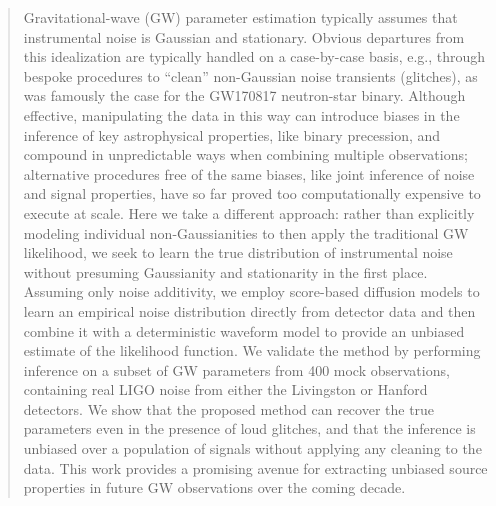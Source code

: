 \documentclass[twocolumn]{aastex631}
\begin{document}
\begin{abstract}
Gravitational-wave (GW) parameter estimation typically assumes that instrumental noise is Gaussian and stationary. Obvious departures from this idealization are typically handled on a case-by-case basis, e.g., through bespoke procedures to ``clean'' non-Gaussian noise transients (glitches), as was famously the case for the GW170817 neutron-star binary. Although effective, manipulating the data in this way can introduce biases in the inference of key astrophysical properties, like binary precession, and compound in unpredictable ways when combining multiple observations; alternative procedures free of the same biases, like joint inference of noise and signal properties, have so far proved too computationally expensive to execute at scale. Here we take a different approach: rather than explicitly modeling individual non-Gaussianities to then apply the traditional GW likelihood, we seek to learn the true distribution of instrumental noise without presuming Gaussianity and stationarity in the first place. Assuming only noise additivity, we employ score-based diffusion models to learn an empirical noise distribution directly from detector data and then combine it with a deterministic waveform model to provide an unbiased estimate of the likelihood function. We validate the method by performing inference on a subset of GW parameters from 400 mock observations, containing real LIGO noise from either the Livingston or Hanford detectors. We show that the proposed method can recover the true parameters even in the presence of loud glitches, and that the inference is unbiased over a population of signals without applying any cleaning to the data. This work provides a promising avenue for extracting unbiased source properties in future GW observations over the coming decade.
\end{abstract}

\keywords{}
\end{document}
